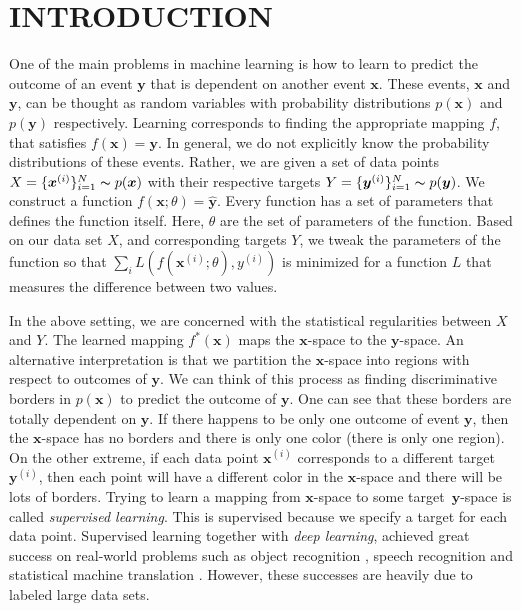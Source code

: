 \documentclass[a4paper,onesided,12pt]{report}
\begin{document}
\begin{abbreviations}
\end{abbreviations}


\chapter{INTRODUCTION}
\label{chapter:intro}
One of the main problems in machine learning is how to learn to predict the outcome of an event $\boldsymbol{y}$ that is dependent on another event $\boldsymbol{x}$. These events, $\boldsymbol{x}$ and $\boldsymbol{y}$, can be thought as random variables with probability distributions $p(\boldsymbol{x})$ and $p(\boldsymbol{y})$ respectively. Learning corresponds to finding the appropriate mapping $f$, that satisfies $f(\boldsymbol{x}) = \boldsymbol{y}$. In general, we do not explicitly know the probability distributions of these events. Rather, we are given a set of data points $X=\{\boldsymbol{x}^{(i)}\}_{i=1}^{N}\thicksim p(\boldsymbol{x})$ with their respective targets $Y=\{\boldsymbol{y}^{(i)}\}_{i=1}^{N}\thicksim p(\boldsymbol{y})$. We construct a function $f(\boldsymbol{x}; \theta)=\hat{\boldsymbol{y}}$. Every function has a set of parameters that defines the function itself. Here, $\theta$ are the set of parameters of the function. Based on our data set $X$, and corresponding targets $Y$, we tweak the parameters of the function so that $\sum_i L(f(\boldsymbol{x}^{(i)}; \theta), y^{(i)})$ is minimized for a function $L$ that measures the difference between two values.



In the above setting, we are concerned with the statistical regularities between $X$ and $Y$. The learned mapping $f^{*}(\boldsymbol{x})$ maps the $\boldsymbol{x}$-space to the $\boldsymbol{y}$-space. An alternative interpretation is that we partition the $\boldsymbol{x}$-space into regions with respect to outcomes of $\boldsymbol{y}$. We can think of this process as finding discriminative borders in $p(\boldsymbol{x})$ to predict the outcome of $\boldsymbol{y}$. One can see that these borders are totally dependent on $\boldsymbol{y}$. If there happens to be only one outcome of event $\boldsymbol{y}$, then the $\boldsymbol{x}$-space has no borders and there is only one color (there is only one region). On the other extreme, if each data point $\boldsymbol{x}^{(i)}$ corresponds to a different target $\boldsymbol{y}^{(i)}$, then each point will have a different color in the $\boldsymbol{x}$-space and there will be lots of borders. Trying to learn a mapping from $\boldsymbol{x}$-space to some target~$\boldsymbol{y}$-space is called \emph{supervised learning}. This is supervised because we specify a target for each data point. Supervised learning together with \emph{deep learning}, achieved great success on real-world problems such as object recognition \cite{alexnet}, speech recognition \cite{acoustic} and statistical machine translation \cite{seq2seq}. However, these successes are heavily due to labeled large data sets.
\end{document}
